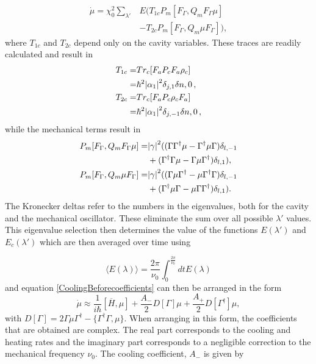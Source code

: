 \documentclass[reprint, amsmath,amssymb, aps,pra]{revtex4-1}
\begin{document}
\begin{align}
\dot{\mu}=\chi_0^2 \sum_{\lambda'}& E(T_{1c}P_m[F_\Gamma,Q_m F_\Gamma \mu]\\
&-T_{2c}P_m[F_\Gamma,Q_m \mu F_\Gamma ]),\nonumber
\end{align}
where $T_{1c}$ and $T_{2c}$ depend only on the cavity variables. These
traces are readily calculated and result in
\begin{align}
T_{1c}=& Tr_c[F_aP_cF_a\rho_c]\\
=&\hbar^2\abs{\alpha_1}^2 \delta_{j,1}\delta{n,0}\, ,\\
T_{2c}=& Tr_c[F_aP_c\rho_cF_a]\\
=&\hbar^2 \abs{\alpha_1}^2 \delta_{j,-1}\delta{n,0}\, ,\\
\end{align}
while the mechanical terms result in
\begin{align}\label{CoolingBeforecoefficients}
P_m[F_\Gamma,Q_m F_\Gamma \mu] =& \abs{\gamma}^2((\Gamma\Gamma^\dagger \mu - \Gamma^\dagger \mu  \Gamma)\delta_{l,-1} \\
&+ (\Gamma^\dagger\Gamma \mu - \Gamma \mu  \Gamma^\dagger)\delta_{l,1}),\nonumber \\
P_m[F_\Gamma,Q_m  \mu F_\Gamma] =& \abs{\gamma}^2((\Gamma\mu\Gamma^\dagger  - \mu\Gamma^\dagger   \Gamma)\delta_{l,-1}\\ 
&+ (\Gamma^\dagger \mu\Gamma -  \mu \Gamma \Gamma^\dagger)\delta_{l,1}). \nonumber
\end{align}
The Kronecker deltas refer to the numbers in the eigenvalues, both for
the cavity and the mechanical oscillator. These eliminate the sum over
all possible $\lambda'$ values. This eigenvalue selection then
determines the value of the functions $E(\lambda')$ and
$E_c(\lambda')$ which are then averaged over time using

\begin{equation}
\langle E(\lambda)\rangle = \frac{2\pi}{\nu_0}\int_0^\frac{2\pi}{\nu_0}dt E(\lambda) 
\end{equation}
and equation \eqref{CoolingBeforecoefficients} can then be
 arranged in the form
\begin{equation}\label{eq:LaserCoolingEqAppendixB}
\dot{\mu} \approx \frac{1}{i\hbar}[\overline{H},\mu] + \frac{A_-}{2}D[\Gamma]\mu + \frac{A_+}{2}D[\Gamma^\dagger]\mu, 
\end{equation}
with
$D[\Gamma] = 2\Gamma \mu \Gamma^\dagger -\{\Gamma^\dagger \Gamma,
\mu\}$. When arranging in this form, the
coefficients that are obtained are complex. The real part corresponds
to the cooling and heating rates and the imaginary part corresponds to
a negligible correction to the mechanical frequency $\nu_0$. The cooling coefficient, $A_-$ is given by
\end{document}
